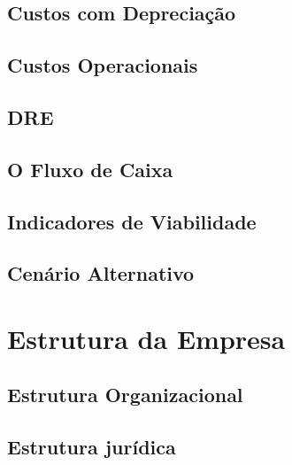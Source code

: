 \documentclass[a4paper, 12pt]{paper}
\begin{document}
\subsection{Custos com Depreciação}
\subsection{Custos Operacionais}
\subsection{DRE}
\subsection{O Fluxo de Caixa}
\subsection{Indicadores de Viabilidade}
\subsection{Cenário Alternativo}
\newpage
\section{Estrutura da Empresa}
\subsection{Estrutura Organizacional}
\subsection{Estrutura jurídica}
\end{document}
